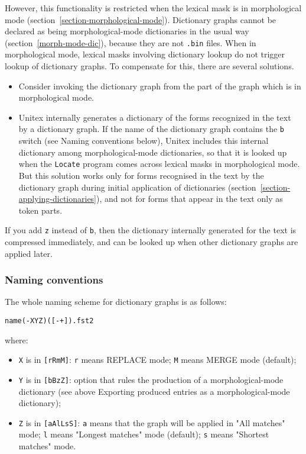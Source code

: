 \bigskip
\noindent However, this functionality is restricted when the lexical mask is
in morphological mode (section~\ref{section-morphological-mode}).
Dictionary graphs cannot be declared as being morphological-mode 
dictionaries in the usual way (section~\ref{morph-mode-dic}), because they are not \verb+.bin+ files.
When in morphological mode, lexical masks involving dictionary lookup do not trigger lookup of dictionary graphs.
To compensate for this, there are several solutions.
\begin{itemize}
\item Consider invoking the dictionary graph from the part of the graph which is in morphological mode.
\item Unitex internally generates a dictionary of the forms recognized in the text by a dictionary graph.
If the name of the dictionary graph contains the \verb+b+ switch (see Naming conventions below),
Unitex includes this internal dictionary among morphological-mode dictionaries, so that it is looked up
when the \verb+Locate+ program comes across lexical masks in morphological mode. But this
solution works only for forms recognised in the text by the dictionary graph during initial application
 of dictionaries (section~\ref{section-applying-dictionaries}), and not for forms that appear in the text only as token parts.
\end{itemize}
If you add \verb+z+ instead of \verb+b+, then the dictionary internally generated for the text
is compressed immediately, and  can be looked up when other dictionary graphs are applied later.
 
\subsubsection{Naming conventions}
The whole naming scheme for dictionary graphs is as follows:

\verb$name(-XYZ)([-+]).fst2$

\noindent where:
\begin{itemize}
\item \verb+X+ is in \verb+[rRmM]+: \verb+r+ means REPLACE mode; \verb+M+ means MERGE mode (default);
\item \verb+Y+ is in \verb+[bBzZ]+: option that rules the production of a morphological-mode dictionary (see above Exporting produced entries as a morphological-mode dictionary);
\item \verb+Z+ is in \verb+[aAlLsS]+: \verb+a+ means that the graph will be applied in "All matches" mode; \verb+l+ means 
      "Longest matches" mode (default); \verb+s+ means "Shortest matches" mode.
\end{itemize}



